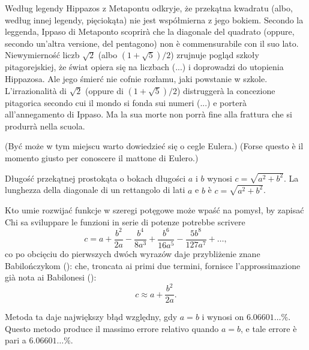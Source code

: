 Według legendy Hippazos z Metapontu odkryje, że przekątna kwadratu (albo, według innej legendy, pięciokąta) nie jest współmierna z jego bokiem. %
Secondo la leggenda, Ippaso di Metaponto scoprirà che la diagonale del quadrato (oppure, secondo un'altra versione, del pentagono) non è commensurabile con il suo lato. %
Niewymierność liczb $\sqrt{2}$ (albo $(1 + \sqrt 5) /2$) zrujnuje pogląd szkoły pitagorejskiej, że świat opiera się na liczbach (...) i doprowadzi do utopienia Hippazosa. %
Ale jego śmierć nie cofnie rozłamu, jaki powstanie w szkole. %
L'irrazionalità di $\sqrt{2}$ (oppure di $(1+\sqrt5)/2$) distruggerà la concezione pitagorica secondo cui il mondo si fonda sui numeri (...) e porterà all'annegamento di Ippaso. %
Ma la sua morte non porrà fine alla frattura che si produrrà nella scuola. %

(Być może w tym miejscu warto dowiedzieć się o cegle Eulera.) %
(Forse questo è il momento giusto per conoscere il mattone di Eulero.) %

\begin{corollary}
    Długość przekątnej prostokąta o bokach długości $a$ i $b$ wynosi $c = \sqrt{a^2 + b^2}$. %
    La lunghezza della diagonale di un rettangolo di lati $a$ e $b$ è $c = \sqrt{a^2+b^2}$. %
\end{corollary}

Kto umie rozwijać funkcje w szeregi potęgowe może wpaść na pomysł, by zapisać %
Chi sa sviluppare le funzioni in serie di potenze potrebbe scrivere %
\begin{equation}
    c = a + \frac{b^2}{2a} - \frac{b^4}{8a^3} + \frac{b^6}{16a^5} - \frac{5b^8}{127a^7} + \ldots,
\end{equation}
co po obcięciu do pierwszych dwóch wyrazów daje przybliżenie znane Babilończykom (\cite[s. 6]{eves1_1972}): %
che, troncata ai primi due termini, fornisce l'approssimazione già nota ai Babilonesi (\cite[p. 6]{eves1_1972}): %
\begin{equation}
    c \approx a + \frac{b^2}{2a}.
\end{equation}

Metoda ta daje największy błąd względny, gdy $a = b$ i wynosi on $6.06601\ldots \%$. %
Questo metodo produce il massimo errore relativo quando $a=b$, e tale errore è pari a $6.06601\ldots \%$. %

